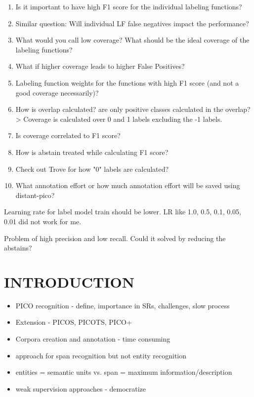 \documentclass[10.7pt,]{article}
\begin{document}
\begin{enumerate}
    \item Is it important to have high F1 score for the individual labeling functions?
    \item Similar question: Will individual LF false negatives impact the performance?
    \item What would you call low coverage? What should be the ideal coverage of the labeling functions?
    \item What if higher coverage leads to higher False Positives?
    \item Labeling function weights for the functions with high F1 score (and not a good coverage necessarily)?
    \item How is overlap calculated? are only positive classes calculated in the overlap? > Coverage is calculated over 0 and 1 labels excluding the -1 labels.
    \item Is coverage correlated to F1 score?
    \item How is abstain treated while calculating F1 score?
    \item Check out Trove for how "0" labels are calculated?
    \item What annotation effort or how much annotation effort will be saved using distant-pico?
\end{enumerate}

Learning rate for label model train should be lower. LR like 1.0, 0.5, 0.1, 0.05, 0.01 did not work for me.

Problem of high precision and low recall. Could it solved by reducing the abstains?



%
%
%
\section{INTRODUCTION}\label{introduction}
%
\begin{itemize}
    \item PICO recognition - define, importance in SRs, challenges, slow process
    \item Extension - PICOS, PICOTS, PICO+
    \item Corpora creation and annotation - time consuming
    \item approach for span recognition but not entity recognition
    \item entities = semantic units vs. span = maximum information/description
    \item weak supervision approaches - democratize
\end{itemize}
%
%
%
\end{document}
